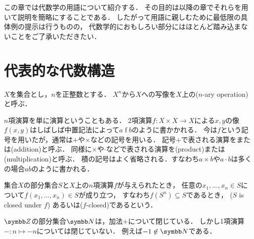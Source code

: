 \documentclass[../main.tex]{subfiles}
\begin{document}

この章では代数学の用語について紹介する．
その目的は以降の章でそれらを用いて説明を簡略にすることである．
したがって用語に親しむために最低限の具体例の提示は行うものの，
代数学的におもしろい部分にはほとんど踏み込まないことをご了承いただきたい．

\section{代表的な代数構造}

\begin{thmbox}
\begin{definition}
\(X\)を集合とし，\(n\)を正整数とする．
\(X^n\)から\(X\)への写像を\(X\)上の(\(n\)-ary operation)と呼ぶ{\footnotemark}．
\end{definition}
\end{thmbox}


\(n\)項演算を単に演算ということもある．
\(2\)項演算\(f \colon X \times X \to X\)による\(x, y\)の像\(f(x, y)\)はしばしば中置記法によって\(a \mathbin{f} b\)のように書かかれる．
今は\(f\)という記号を用いたが，通常は\(\mathord{+}\)や\(\mathord{\times}\)などの記号を用いる．
記号\(\mathord{+}\)で表される演算をまたは(addition)と呼ぶ．
同様に\(\mathord{\times}\)や\(\mathord{\cdot}\)などで表される演算を(product)または(multiplication)と呼ぶ．
積の記号はよく省略される．すなわち\(a \times b\)や\(a \cdot b\)は多くの場合\(ab\)のように書かれる．

集合\(X\)の部分集合\(S\)と\(X\)上の\(n\)項演算\(f\)が与えられたとき，
任意の\(x_1, \ldots, x_n \in S\)について\(f(x_1, \ldots, x_n) \in S\)が成り立つ，
すなわち\(f(S^n) \subseteq S\)であるとき，
(\(S\) is closed under \(f\))
あるいは(\(f\)-closed)であるという．

\begin{exa} \(\Integer\)の部分集合\(\NaturalNumber\)は，加法\(\mathord{+}\)について閉じている．
しかし1項演算\(\mathord{-}\colon n \mapsto -n\)については閉じていない．
例えば\(-1 \not\in \NaturalNumber\)である．
\end{exa}
\end{document}
